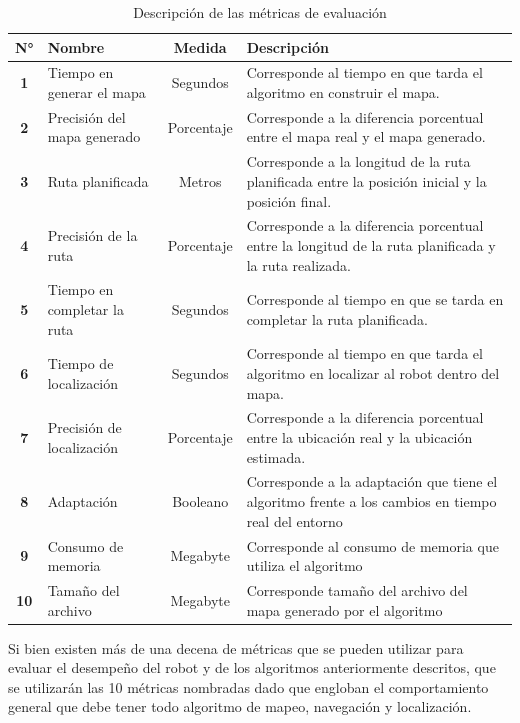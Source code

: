 \begin{table}[H]
    \centering
    \begin{tabular}{|c|p{4cm}|c|p{8.5cm}|}
    \hline
    \textbf{N°} & \textbf{Nombre}             & \textbf{Medida} & \textbf{Descripción}                                                                               \\ \hline
    \textbf{1}  & Tiempo en generar el mapa   & Segundos        & Corresponde al tiempo en que tarda el algoritmo en construir el mapa.                              \\ \hline
    \textbf{2}  & Precisión del mapa generado & Porcentaje      & Corresponde a la diferencia porcentual entre el mapa real y el mapa generado.                      \\ \hline
    \textbf{3}  & Ruta planificada            & Metros          & Corresponde a la longitud de la ruta planificada entre la posición inicial y la posición final.    \\ \hline
    \textbf{4}  & Precisión de la ruta            & Porcentaje          & Corresponde a la diferencia porcentual entre la longitud de la ruta planificada y la ruta realizada.   
    \\ \hline
    \textbf{5}  & Tiempo en completar la ruta & Segundos        & Corresponde al tiempo en que se tarda en completar la ruta planificada.                            \\ \hline
    \textbf{6}  & Tiempo de localización      & Segundos        & Corresponde al tiempo en que tarda el algoritmo en localizar al robot dentro del mapa.             \\ \hline
    \textbf{7}  & Precisión de localización   & Porcentaje      & Corresponde a la diferencia porcentual entre la ubicación real y la ubicación estimada.            \\ \hline
    \textbf{8}  & Adaptación                  & Booleano        & Corresponde a la adaptación que tiene el algoritmo frente a los cambios en tiempo real del entorno \\ \hline
    \textbf{9}  & Consumo de memoria                  & Megabyte        & Corresponde al consumo de memoria que utiliza el algoritmo \\ \hline
    \textbf{10}  & Tamaño del archivo                 & Megabyte        & Corresponde tamaño del archivo del mapa generado por el algoritmo \\ \hline
    \end{tabular}
    \caption{Descripción de las métricas de evaluación}
    \label{tab:metricas de evaluacion}
\end{table}
Si bien existen más de una decena de métricas que se pueden utilizar para evaluar el desempeño del robot y de los algoritmos anteriormente descritos, que se utilizarán las 10 métricas nombradas dado que engloban el comportamiento general que debe tener todo algoritmo de mapeo, navegación y localización. 

